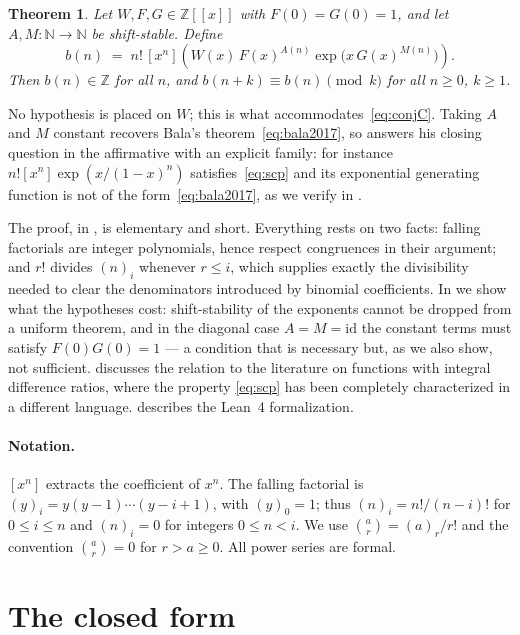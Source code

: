 \documentclass[11pt,a4paper]{article}
\theoremstyle{plain}
\newtheorem{theorem}{Theorem}
\theoremstyle{definition}
\newcommand{\N}{\mathbb{N}}
\newcommand{\Z}{\mathbb{Z}}
\newcommand{\ff}[2]{(#1)_{#2}}
\newcommand{\coeff}[1]{[x^{#1}]}
\begin{document}
\begin{theorem}\label{thm:main}
Let $W,F,G\in\Z[[x]]$ with $F(0)=G(0)=1$, and let $A,M\colon\N\to\N$ be shift-stable.
Define
\[
  b(n)\;=\;n!\,\coeff{n}\!\left(W(x)\,F(x)^{A(n)}\exp\!\big(x\,G(x)^{M(n)}\big)\right).
\]
Then $b(n)\in\Z$ for all $n$, and $b(n+k)\equiv b(n)\pmod{k}$ for all $n\ge0$, $k\ge1$.
\end{theorem}

No hypothesis is placed on $W$; this is what accommodates~\eqref{eq:conjC}. Taking $A$ and
$M$ constant recovers Bala's theorem~\eqref{eq:bala2017}, so  answers his
closing question in the affirmative with an explicit family: for instance
$n!\coeff{n}\exp(x/(1-x)^n)$ satisfies~\eqref{eq:scp} and its exponential generating
function is not of the form~\eqref{eq:bala2017}, as we verify in
.

The proof, in , is elementary and short. Everything rests on two facts:
falling factorials are integer polynomials, hence respect congruences in their argument;
and $r!$ divides $\ff{n}{i}$ whenever $r\le i$, which supplies exactly the divisibility
needed to clear the denominators introduced by binomial coefficients. In
 we show what the hypotheses cost: shift-stability of the exponents
cannot be dropped from a uniform theorem, and in the diagonal case $A=M=\mathrm{id}$ the
constant terms must satisfy $F(0)G(0)=1$ --- a condition that is necessary but, as we
also show, not sufficient.
 discusses the relation to the literature on functions with integral
difference ratios, where the property \eqref{eq:scp} has been completely characterized in
a different language.  describes the Lean~4 formalization.

\paragraph{Notation.}
$\coeff{n}$ extracts the coefficient of $x^n$. The falling factorial is
$\ff{y}{i}=y(y-1)\cdots(y-i+1)$, with $\ff{y}{0}=1$; thus $\ff{n}{i}=n!/(n-i)!$ for
$0\le i\le n$ and $\ff{n}{i}=0$ for integers $0\le n<i$. We use
$\binom{a}{r}=\ff{a}{r}/r!$ and the convention $\binom{a}{r}=0$ for $r>a\ge0$. All power
series are formal.

\section{The closed form}\label{sec:closed}
\end{document}
